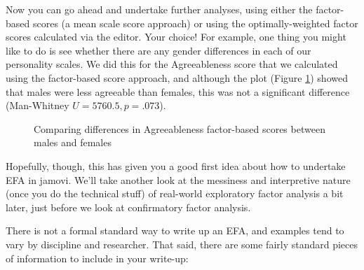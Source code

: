 Now you can go ahead and undertake further analyses, using either the factor-based scores (a mean scale score approach) or using the optimally-weighted factor scores calculated via the  editor. Your choice! 
For example, one thing you might like to do is see whether there are any gender differences in each of our personality scales. We did this for the Agreeableness score that we calculated using the factor-based score approach, and although the plot (Figure \ref{fig:fa12}) showed that males were less agreeable than females, this was not a significant difference (Man-Whitney $U=5760.5, p=.073$).

\begin{figure}[!htb]
\begin{center}
\caption{Comparing differences in Agreeableness factor-based scores between males and females}
\label{fig:fa12}
\HR
\end{center}
\end{figure}

Hopefully, though, this has given you a good first idea about how to undertake EFA in jamovi. We’ll take another look at the messiness and interpretive nature (once you do the technical stuff) of real-world exploratory factor analysis a bit later, just before we look at confirmatory factor analysis.


There is not a formal standard way to write up an EFA, and examples tend to vary by discipline and researcher. That said, there are some fairly standard pieces of information to include in your write-up: 

